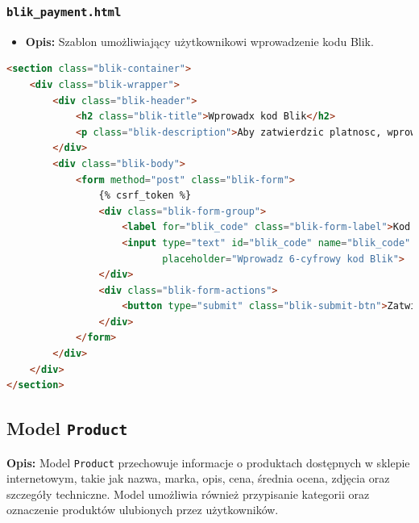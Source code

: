 \documentclass[12pt,a4paper,oneside]{article}
\theoremstyle{definition}
\numberwithin{equation}{section}
\begin{document}
\subsubsection*{\texttt{blik\_payment.html}}
\begin{itemize}
    \item \textbf{Opis:} Szablon umożliwiający użytkownikowi wprowadzenie kodu Blik.
\end{itemize}

\begin{lstlisting}[language=HTML, caption=Szablon blik_payment.html]
<section class="blik-container">
    <div class="blik-wrapper">
        <div class="blik-header">
            <h2 class="blik-title">Wprowadx kod Blik</h2>
            <p class="blik-description">Aby zatwierdzic platnosc, wprowadz 6-cyfrowy kod wygenerowany w aplikacji mobilnej banku.</p>
        </div>
        <div class="blik-body">
            <form method="post" class="blik-form">
                {% csrf_token %}
                <div class="blik-form-group">
                    <label for="blik_code" class="blik-form-label">Kod Blik</label>
                    <input type="text" id="blik_code" name="blik_code" maxlength="6" class="blik-form-input"
                           placeholder="Wprowadz 6-cyfrowy kod Blik">
                </div>
                <div class="blik-form-actions">
                    <button type="submit" class="blik-submit-btn">Zatwierdz kod</button>
                </div>
            </form>
        </div>
    </div>
</section>
\end{lstlisting}

% 
% 
% 
% 
\subsection{Model \texttt{Product}}

\textbf{Opis:}  
Model \texttt{Product} przechowuje informacje o produktach dostępnych w sklepie internetowym, takie jak nazwa, marka, opis, cena, średnia ocena, zdjęcia oraz szczegóły techniczne. Model umożliwia również przypisanie kategorii oraz oznaczenie produktów ulubionych przez użytkowników.
\end{document}
